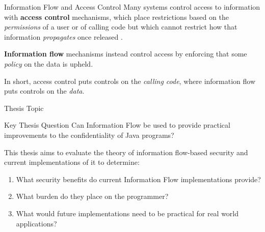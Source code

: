 \begin{frame}{Information Flow and Access Control}
	Many systems control access to information with \textbf{access control} mechanisms, which place restrictions based on the \textit{permissions} of a user or of calling code but which cannot restrict how that information \textit{propagates} once released \cite{ifbackground:sabelfeld}.
	
	\textbf{Information flow} mechanisms instead control access by enforcing that some \textit{policy} on the data is upheld.
	
	In short, access control puts controls on the \textit{calling code}, where information flow puts controls on the \textit{data}.
\end{frame}

%			
%			



\begin{frame}{Thesis Topic}
	\begin{block}{Key Thesis Question}
		Can Information Flow be used to provide practical improvements to the confidentiality of Java programs?
	\end{block}
	
	This thesis aims to evaluate the theory of information flow-based security and current implementations of it to determine:
	
	\begin{enumerate}
		\item What security benefits do current Information Flow implementations provide?
		\item What burden do they place on the programmer?
		\item What would future implementations need to be practical for real world applications? 
	\end{enumerate}
\end{frame}